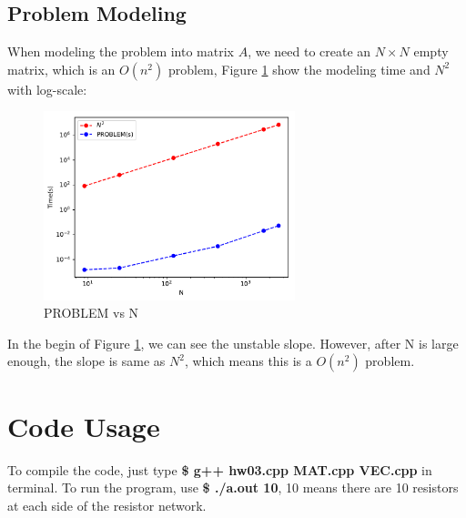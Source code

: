 \documentclass{article}
\begin{document}
\subsection{Problem Modeling}
When modeling the problem into matrix $A$, we need to create an $N \times N$ empty matrix, which is an $O(n^2)$ problem,
Figure \ref{fig:problem} show the modeling time and $N^2$ with log-scale:
\begin{figure}[H]
    \centering
    \includegraphics[width=0.65\textwidth]{src/problem.pdf}
    \caption{PROBLEM vs N}
    \label{fig:problem}
\end{figure}
In the begin of Figure \ref{fig:problem}, we can see the unstable slope. However, after N is large enough, the slope is
same as $N^2$, which means this is a {\boldmath$O(n^2)$} problem.

\section{Code Usage}
To compile the code, just type \textbf{\$ g++ hw03.cpp MAT.cpp VEC.cpp} in terminal. \newline
To run the program, use \textbf{\$ ./a.out 10}, 10 means there are 10 resistors at each side of the resistor network.
\end{document}
